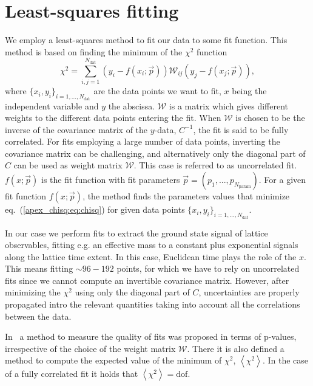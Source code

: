 
\chapter{Least-squares fitting}
\label{apex_chisq}

We employ a least-squares method to fit our data to some fit function. This method is based on finding the  minimum of the $\chi^2$ function
\begin{equation}
\label{apex_chisq:eq:chisq}
\chi^2=\sum_{i,j=1}^{N_{\textrm{dat}}}\left(y_i-f(x_i;\vec{p})\right)\mathcal{W}_{ij}\left(y_j-f(x_j;\vec{p})\right),
\end{equation}
where $\{x_i,y_i\}_{i=1,...,N_{\textrm{dat}}}$ are the data points we want to fit, $x$ being the independent variable and $y$ the abscissa. $\mathcal{W}$ is a matrix which gives different weights to the different data points entering the fit. When $\mathcal{W}$ is chosen to be the inverse of the covariance matrix of the $y$-data, $C^{-1}$, the fit is said to be fully correlated. For fits employing a large number of data points, inverting the covariance matrix can be challenging, and alternatively only the diagonal part of $C$ can be used as weight matrix $\mathcal{W}$. This case is referred to as uncorrelated fit. $f(x;\vec{p})$ is the fit function with fit parameters $\vec{p}=(p_1,...,p_{N_{\textrm{param}}})$. For a given fit function $f(x;\vec{p})$, the method finds the parameters values that minimize eq.~(\ref{apex_chisq:eq:chisq}) for given data points $\{x_i,y_i\}_{i=1,...,N_{\textrm{dat}}}$.

In our case we perform fits to extract the ground state signal of lattice observables, fitting e.g. an effective mass to a constant plus exponential signals along the lattice time extent. In this case, Euclidean time plays the role of the $x$. This means fitting $\sim96-192$ points, for which we have to rely on uncorrelated fits since we cannot compute an invertible covariance matrix. However, after minimizing the $\chi^2$ using only the diagonal part of $C$, uncertainties are properly propagated intro the relevant quantities taking into account all the correlations between the data.

In~\citep{Bruno:2022mfy} a method to measure the quality of fits was proposed in terms of p-values, irrespective of the choice of the weight matrix $\mathcal{W}$. There it is also defined a method to compute the expected value of the minimum of $\chi^2$, $\left<\chi^2\right>$. In the case of a fully correlated fit it holds that $\left<\chi^2\right>={\textrm{dof}}$.

